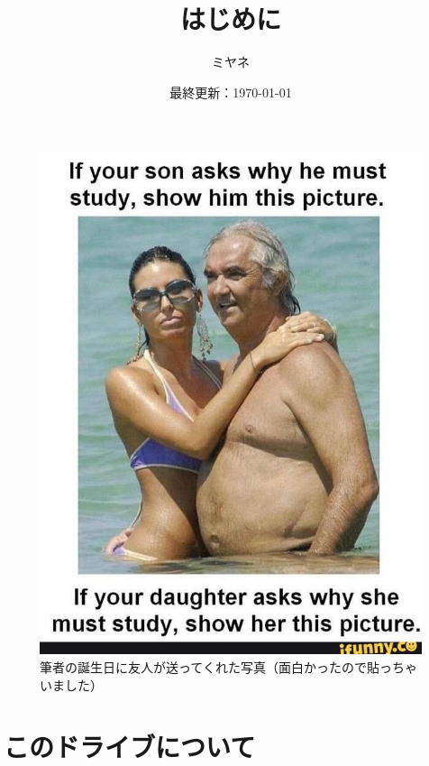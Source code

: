 \documentclass[a4paper,pdflatex,ja=standard]{bxjsarticle}
\title{はじめに}
\author{ミヤネ}
\date{最終更新：\today}
\begin{document}
\maketitle

\tableofcontents
\clearpage

\begin{figure}[ht]
  \centering
  \includegraphics[keepaspectratio, scale=0.65]{fig/1690817582195.jpg}
  \caption{筆者の誕生日に友人が送ってくれた写真（面白かったので貼っちゃいました）}
\end{figure}


\clearpage

\section{このドライブについて}
\end{document}

